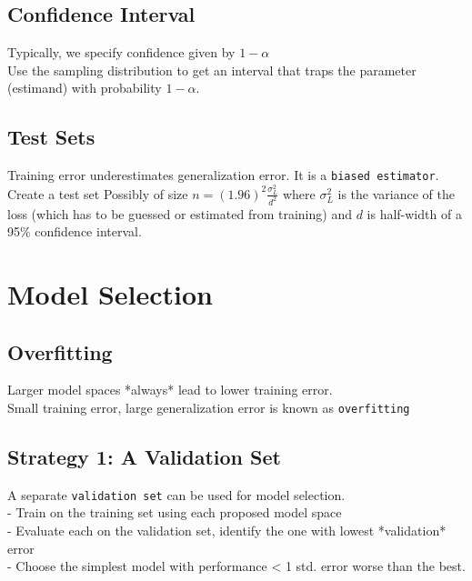 \documentclass[10pt,landscape,a4paper]{cheatsheet}
\begin{document}
  \subsection{Confidence Interval}

  Typically, we specify confidence given by $1 - \alpha$\\
  Use the sampling distribution to get  
  an interval that traps the parameter (estimand) with probability $1 - \alpha$.

  \subsection{Test Sets}

  Training error underestimates generalization error. It is a \texttt{biased estimator}.\\
  Create a test set Possibly of size $n = (1.96)^2\frac{\sigma_L^2}{d^2}$ where $\sigma_L^2$ 
  is the variance of the loss (which has to be guessed or estimated from training) and $d$ is half-width of a 95\% confidence interval.

  \section{Model Selection}

  \subsection{Overfitting}
  
  Larger model spaces *always* lead to lower training error.\\
  Small training error, large generalization error is known as \texttt{overfitting}

  \subsection{Strategy 1: A Validation Set}
  A separate \texttt{validation set} can be used for model selection.\\
    - Train on the training set using each proposed model space\\
    - Evaluate each on the validation set, identify the one with lowest *validation* error\\
    - Choose the simplest model with performance < 1 std. error worse than the best.
\end{document}

